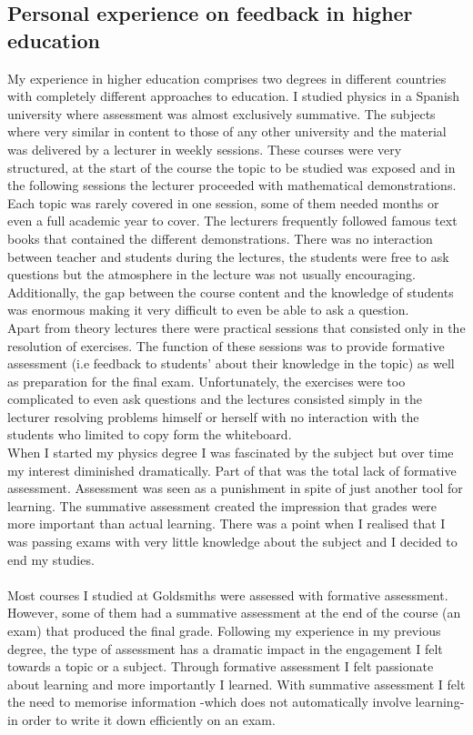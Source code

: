 \documentclass[11pt, oneside]{article}   	%
\begin{document}
\subsection{Personal experience on feedback in higher education}
My experience in higher education comprises two degrees in different countries with completely different approaches to education. I studied physics in a Spanish university where assessment was almost exclusively summative. The subjects where very similar in content to those of any other university and the material was delivered by a lecturer in weekly sessions. These courses were very structured, at the start of the course the topic to be studied was exposed and in the following sessions the lecturer proceeded with mathematical demonstrations. Each topic was rarely covered in one session, some of them needed months or even a full academic year to cover. The lecturers frequently followed famous text books that contained the different demonstrations. There was no interaction between teacher and students during the lectures, the students were free to ask questions but the atmosphere in the lecture was not usually encouraging. Additionally, the gap between the course content and the knowledge of students was enormous making it very difficult to even be able to ask a question.\\
Apart from theory lectures there were practical sessions that consisted only in the resolution of exercises. The function of these sessions was to provide formative assessment (i.e feedback to students' about their knowledge in the topic) as well as preparation for the final exam. Unfortunately, the exercises were too complicated to even ask questions and the lectures consisted simply in the lecturer resolving problems himself or herself with no interaction with the students who limited to copy form the whiteboard.\\
When I started my physics degree I was fascinated by the subject but over time my interest diminished dramatically. Part of that was the total lack of formative assessment. Assessment was seen as a punishment in spite of just another tool for learning. The summative assessment created the impression that grades were more important than actual learning. There was a point when I realised that I was passing exams with very little knowledge about the subject and I decided to end my studies.\\\\
Most courses I studied at Goldsmiths were assessed with formative assessment. However, some of them had a summative assessment at the end of the course (an exam) that produced the final grade. Following my experience in my previous degree, the type of assessment has a dramatic impact in the engagement I felt towards a topic or a subject. Through formative assessment I felt passionate about learning and more importantly I learned. With summative assessment I felt the need to memorise information -which does not automatically involve learning- in order to write it down efficiently on an exam.\\
\end{document}
